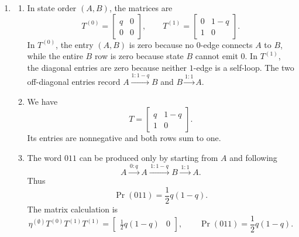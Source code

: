 \documentclass[11pt]{article}
\begin{document}
\begin{solution}[ex:p3-1]
\begin{enumerate}
\begin{enumerate}
            No state permits a path labelled $000$: starting from $0$, the
            first $0$ moves to state $1$, which cannot emit $0$; starting from
            $1$, even the first $0$ is impossible; and starting from $R$, the
            first two zeros move through $R\to0\to1$, after which a third zero
            is impossible. Correspondingly,
            \[
              \eta^{(\emptyset)}T^{(0)}T^{(0)}T^{(0)}
                =\begin{bmatrix}0&0&0\end{bmatrix},
              \qquad
              \Pr(000)=0.
            \]
        \end{enumerate}

      \item
        \begin{enumerate}
          \item In state order $(A,B)$, the matrices are
            \[
              T^{(0)}=
              \begin{bmatrix}
                q&0\\
                0&0
              \end{bmatrix},
              \qquad
              T^{(1)}=
              \begin{bmatrix}
                0&1-q\\
                1&0
              \end{bmatrix}.
            \]
            In $T^{(0)}$, the entry $(A,B)$ is zero because no $0$-edge
            connects $A$ to $B$, while the entire $B$ row is zero because
            state $B$ cannot emit $0$. In $T^{(1)}$, the diagonal entries are
            zero because neither $1$-edge is a self-loop. The two off-diagonal
            entries record $A\xrightarrow{1:1-q}B$ and
            $B\xrightarrow{1:1}A$.

          \item We have
            \[
              T=
              \begin{bmatrix}
                q&1-q\\
                1&0
              \end{bmatrix}.
            \]
            Its entries are nonnegative and both rows sum to one.

          \item The word $011$ can be produced only by starting from $A$ and
            following
            \[
              A\xrightarrow{\,0:q\,}A
               \xrightarrow{\,1:1-q\,}B
               \xrightarrow{\,1:1\,}A.
            \]
            Thus
            \[
              \Pr(011)=\frac12q(1-q).
            \]
            The matrix calculation is
            \[
              \eta^{(\emptyset)}T^{(0)}T^{(1)}T^{(1)}
                =\begin{bmatrix}\tfrac12q(1-q)&0\end{bmatrix},
              \qquad
              \Pr(011)=\frac12q(1-q).
            \]


\end{enumerate}
\end{enumerate}
\end{solution}
\end{document}
